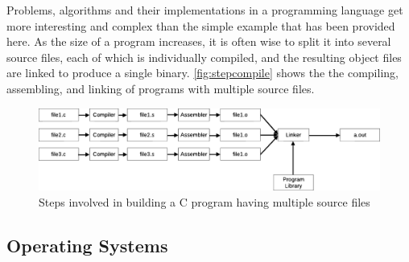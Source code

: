 Problems, algorithms and their implementations in a programming language get more interesting and complex than the simple example that has been provided here. As the size of a program increases, it is often wise to split it into several source files, each of which is individually compiled, and the resulting object files are linked to produce a single binary. \autoref{fig:stepcompile} shows the the compiling, assembling, and linking of programs with multiple source files.
\begin{figure}[h]
\centering
\includegraphics[scale=0.22]{figures/steps-of-compilation.eps}
\caption{Steps involved in building a C program having multiple source files}
\label{fig:stepcompile}
\end{figure}

\subsection{Operating Systems}
